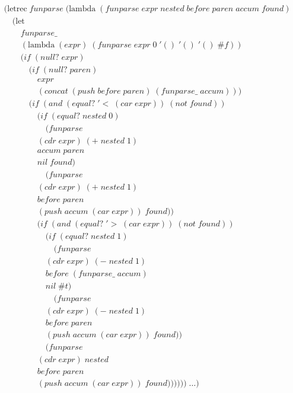 \clearpage
\begin{figure}[ht]
\caption{}\label{scheme}
\begin{align*}
& (\text{letrec} \; funparse \; (\text{lambda} \; (funparse \; expr \; nested \; before \; paren \; accum \; found) \; 
\\& \quad (\text{let} \; 
\\& \qquad funparse\_ \; 
\\& \qquad (\text{lambda} \; (expr) \; (funparse \; expr \; 0 \; '() \; '() \; '() \; \#f))
\\& \qquad (if \; (null? \; expr)
\\& \qquad \quad (if \; (null? \; paren) \; 
\\& \qquad \qquad expr
\\& \qquad \qquad (concat \; (push \; before \; paren) \; (funparse\_ \; accum)))
\\& \qquad \quad (if \; (and \; (equal? \; '< \; (car \; expr)) \; (not \; found))
\\& \qquad \qquad (if \; (equal? \; nested \; 0)
\\& \qquad \qquad \quad (funparse \; 
\\& \qquad \qquad (cdr \; expr) \; (+ \; nested \; 1) \; 
\\& \qquad \qquad accum \; paren \; 
\\& \qquad \qquad nil \; found)
\\& \qquad \qquad \quad (funparse \; 
\\& \qquad \qquad (cdr \; expr) \; (+ \; nested \; 1) \; 
\\& \qquad \qquad before \; paren \; 
\\& \qquad \qquad (push \; accum \; (car \; expr)) \; found))
\\& \qquad \qquad (if \; (and \; (equal? \; '> \; (car \; expr)) \; (not \; found))
\\& \qquad \qquad \quad (if \; (equal? \; nested \; 1)
\\& \qquad \qquad \qquad (funparse \; 
\\& \qquad \qquad \quad (cdr \; expr) \; (- \; nested \; 1) \; 
\\& \qquad \qquad \quad before \; (funparse\_ \; accum) \; 
\\& \qquad \qquad \quad nil \; \#t)
\\& \qquad \qquad \qquad (funparse \; 
\\& \qquad \qquad \quad (cdr \; expr) \; (- \; nested \; 1) \; 
\\& \qquad \qquad \quad before \; paren \; 
\\& \qquad \qquad \quad (push \; accum \; (car \; expr)) \; found))
\\& \qquad \qquad \quad (funparse \; 
\\& \qquad \qquad (cdr \; expr) \; nested \; 
\\& \qquad \qquad before \; paren \; 
\\& \qquad \qquad (push \; accum \; (car \; expr)) \; found)))))) \; \dots)
\end{align*}
\end{figure}

